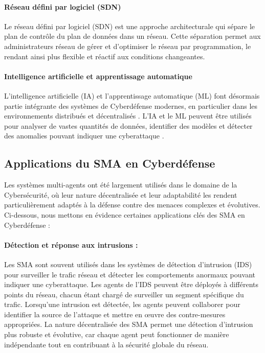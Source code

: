 \paragraph{Réseau défini par logiciel (SDN)}

Le réseau défini par logiciel (SDN) est une approche architecturale qui sépare le plan de contrôle du plan de données dans un réseau. Cette séparation permet aux administrateurs réseau de gérer et d'optimiser le réseau par programmation, le rendant ainsi plus flexible et réactif aux conditions changeantes. \cite{Kreutz2015}

\paragraph{Intelligence artificielle et apprentissage automatique}

L'intelligence artificielle (IA) et l'apprentissage automatique (ML) font désormais partie intégrante des systèmes de Cyberdéfense modernes, en particulier dans les environnements distribués et décentralisés \cite{Buczak2016}. L'IA et le ML peuvent être utilisés pour analyser de vastes quantités de données, identifier des modèles et détecter des anomalies pouvant indiquer une cyberattaque \cite{Vinayakumar2019}.


\subsection{Applications du SMA en Cyberdéfense}

Les systèmes multi-agents ont été largement utilisés dans le domaine de la Cybersécurité, où leur nature décentralisée et leur adaptabilité les rendent particulièrement adaptés à la défense contre des menaces complexes et évolutives. Ci-dessous, nous mettons en évidence certaines applications clés des SMA en Cyberdéfense :

\paragraph{Détection et réponse aux intrusions :}
Les SMA sont souvent utilisés dans les systèmes de détection d'intrusion (IDS) pour surveiller le trafic réseau et détecter les comportements anormaux pouvant indiquer une cyberattaque. Les agents de l'IDS peuvent être déployés à différents points du réseau, chacun étant chargé de surveiller un segment spécifique du trafic. Lorsqu'une intrusion est détectée, les agents peuvent collaborer pour identifier la source de l'attaque et mettre en œuvre des contre-mesures appropriées. La nature décentralisée des SMA permet une détection d'intrusion plus robuste et évolutive, car chaque agent peut fonctionner de manière indépendante tout en contribuant à la sécurité globale du réseau.

